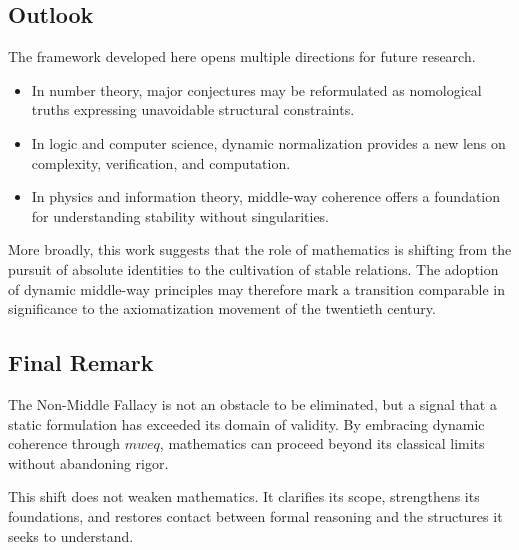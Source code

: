 \documentclass[11pt]{article}
\begin{document}
\subsection{Outlook}

The framework developed here opens multiple directions for future
research.

\begin{itemize}
  \item In number theory, major conjectures may be reformulated as
  nomological truths expressing unavoidable structural constraints.
  \item In logic and computer science, dynamic normalization provides a
  new lens on complexity, verification, and computation.
  \item In physics and information theory, middle-way coherence offers
  a foundation for understanding stability without singularities.
\end{itemize}

More broadly, this work suggests that the role of mathematics is
shifting from the pursuit of absolute identities to the cultivation of
stable relations.
The adoption of dynamic middle-way principles may therefore mark a
transition comparable in significance to the axiomatization movement
of the twentieth century.

\subsection{Final Remark}

The Non-Middle Fallacy is not an obstacle to be eliminated, but a signal
that a static formulation has exceeded its domain of validity.
By embracing dynamic coherence through $mweq$, mathematics can proceed
beyond its classical limits without abandoning rigor.

This shift does not weaken mathematics.
It clarifies its scope, strengthens its foundations, and restores
contact between formal reasoning and the structures it seeks to
understand.
\end{document}
